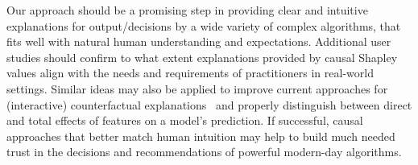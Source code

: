 \documentclass{article}
\newcommand{\comment}[1]{{\color{red} #1}}
\begin{document}
Our approach should be a promising step in providing clear and intuitive explanations for output/decisions by a wide variety of complex algorithms, that fits well with natural human understanding and expectations. Additional user studies should confirm to what extent explanations provided by causal Shapley values align with the needs and requirements of practitioners in real-world settings. Similar ideas may also be applied to improve current approaches for (interactive) counterfactual explanations~\cite{wachter2017counterfactual} and properly distinguish between direct and total effects of features on a model's prediction.
If successful, causal approaches that better match human intuition may help to build much needed trust in the decisions and recommendations of powerful modern-day algorithms. 


%
%
\end{document}
